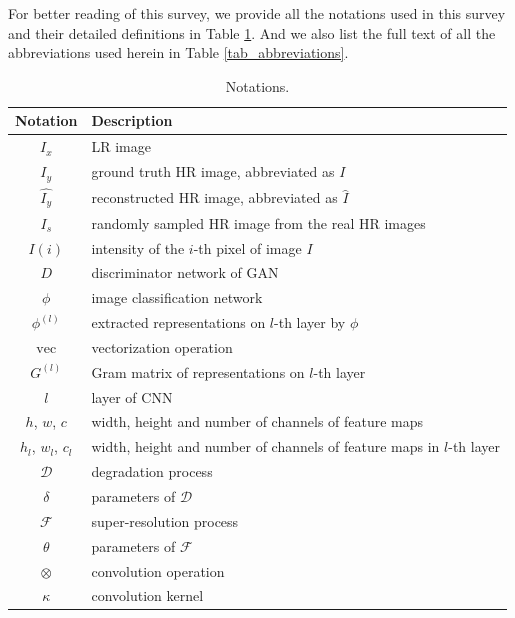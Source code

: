 {For better reading of this survey, we provide all the notations used in this survey and their detailed definitions in Table \ref{tab_notations}.
And we also list the full text of all the abbreviations used herein in Table \ref{tab_abbreviations}.
\fi
\setcounter{table}{0}
\setcounter{page}{1}
\begin{table}[h]
    \renewcommand{\arraystretch}{1.3}
    \caption{Notations.}
    \label{tab_notations}
    \centering
    \begin{tabular}{|c|l|}
        \hline
        Notation        & Description \\
        \hline
        $I_x$           & LR image \\
        $I_y$           & ground truth HR image, abbreviated as $I$ \\
        $\hat{I_y}$     & reconstructed HR image, abbreviated as $\hat{I}$ \\
        $I_s$           & randomly sampled HR image from the real HR images \\
        \hline
        $I(i)$          & intensity of the $i$-th pixel of image $I$ \\
        $D$             & discriminator network of GAN \\
        $\phi$          & image classification network \\
        $\phi^{(l)}$    & extracted representations on $l$-th layer by $\phi$ \\
        $\operatorname{vec}$ &  vectorization operation \\
        $G^{(l)}$       & Gram matrix of representations on $l$-th layer \\
        $l$             & layer of CNN \\
        $h$, $w$, $c$   & width, height and number of channels of feature maps \\
        $h_l$, $w_l$, $c_l$  & width, height and number of channels of feature maps in $l$-th layer \\
        \hline
        $\mathcal{D}$   & degradation process \\
        $\delta$        & parameters of $\mathcal{D}$ \\
        $\mathcal{F}$   & super-resolution process \\
        $\theta$        & parameters of $\mathcal{F}$ \\
        \hline
        $\otimes$       & convolution operation \\
        $\kappa$        & convolution kernel \\

\end{tabular}
\end{table}}

